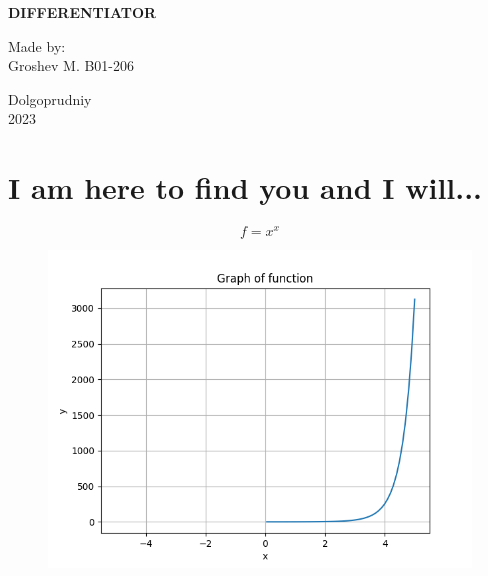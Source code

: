 \documentclass[a4paper, 12pt]{article}
\title{}
\date{}
\begin{document}

    \begin{titlepage}
    \maketitle
    \thispagestyle{empty}

            \begin{center}
                  \Large \textbf{DIFFERENTIATOR}
            \end{center}

             \vspace{20em}
             \begin{flushright}
                 \normalsize Made by: \\
                             Groshev M. B01-206
             \end{flushright}

             \begin{center}
                    \vfill \normalsize Dolgoprudniy \\ 2023
             \end{center}
    \end{titlepage}


\section{I am here to find you and I will...}\begin{equation*}
    f = {{x}}^{{x}}
\end{equation*}

\begin{figure}[h!]
        \centering
         \includegraphics[scale=0.5]{./LaTeX/tex_pics/func.png}
\end{figure}
\end{document}
